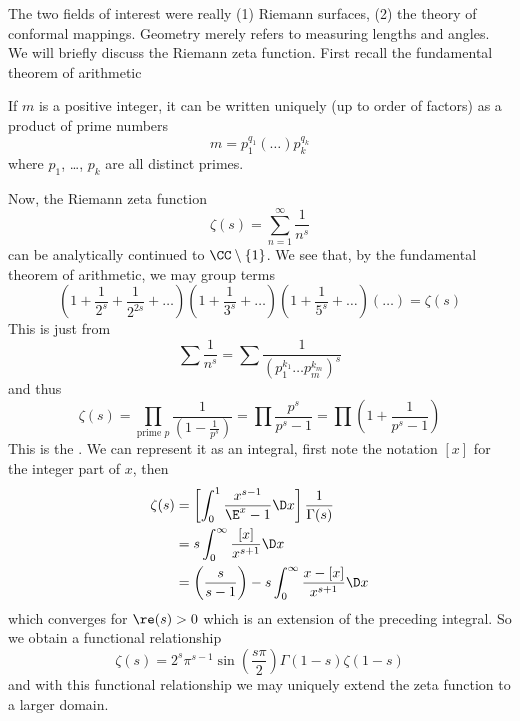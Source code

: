 The two fields of interest were really (1) Riemann surfaces, (2) the
theory of conformal mappings. Geometry merely refers to measuring
lengths and angles. We will briefly discuss the Riemann zeta
function. First recall the fundamental theorem of arithmetic
\begin{thm}
If $m$ is a positive integer, it can be written uniquely (up to
order of factors) as a product of prime numbers
\begin{equation}
m = p_{1}^{q_{1}}(\dots)p_{k}^{q_{k}}
\end{equation}
where $p_{1}$, \dots, $p_{k}$ are all distinct primes.
\end{thm}
Now, the Riemann zeta function
\begin{equation}
\zeta(s)=\sum^{\infty}_{n=1}\frac{1}{n^{s}}
\end{equation}
can be analytically continued to $\CC\setminus\{1\}$. We see
that, by the fundamental theorem of arithmetic, we may group
terms
\begin{equation}
\left(1+\frac{1}{2^{s}}+\frac{1}{2^{2s}}+\dots\right)\left(1+\frac{1}{3^{s}}+\dots\right)\left(1+\frac{1}{5^{s}}+\dots\right)(\dots)=\zeta(s)
\end{equation}
This is just from 
\begin{equation}
\sum\frac{1}{n^{s}}=\sum\frac{1}{(p_{1}^{k_{1}}\dots p_{m}^{k_{m}})^{s}}
\end{equation}
and thus
\begin{equation}
\zeta(s) = \prod_{\text{prime }p}\frac{1}{\left(1-\displaystyle\frac{1}{p^{s}}\right)}=\prod\frac{p^{s}}{p^{s}-1}=\prod\left(1+\frac{1}{p^{s}-1}\right)
\end{equation}
This is the . We can represent it as an
integral, first note the notation $[x]$ for the integer part of
$x$, then
\begin{subequations}
\begin{align}
\zeta(s) &=\left[\int^{1}_{0}\frac{x^{s-1}}{\E^{x}-1}\D x\right]\frac{1}{\Gamma(s)}\\
&=s\int^{\infty}_{0}\frac{[x]}{x^{s+1}}\D x\\
&=\left(\frac{s}{s-1}\right)-s\int^{\infty}_{0}\frac{x-[x]}{x^{s+1}}\D
x
\end{align}
\end{subequations}
which converges for $\re(s)>0$ which is an extension of the
preceding integral. So we obtain a functional relationship
\begin{equation}\label{eq:reflectionPrincipleForZeta}
\zeta(s)=2^{s}\pi^{s-1}\sin\left(\frac{s\pi}{2}\right)\Gamma(1-s)\zeta(1-s)
\end{equation}
and with this functional relationship we may uniquely extend the
zeta function to a larger domain.
